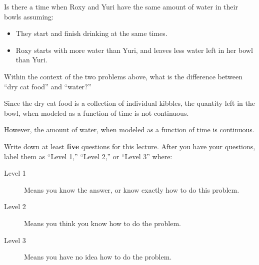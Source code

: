 \documentclass{ximera}
\begin{document}
\begin{problem}
  Is there a time when Roxy and Yuri have the same amount of water in
  their bowls assuming:
  \begin{itemize}
  \item They start and finish drinking at the same times.
  \item Roxy starts with more water than Yuri, and leaves less water
    left in her bowl than Yuri.
  \end{itemize}
    \begin{multipleChoice}
  \end{multipleChoice}
\end{problem}



\begin{problem}
  Within the context of the two problems above, what is the difference
  between ``dry cat food'' and ``water?''
  \begin{freeResponse}
    Since the dry cat food is a collection of individual kibbles, the
    quantity left in the bowl, when modeled as a function of time is
    not continuous.

    However, the amount of water, when modeled as a function of time
    is continuous. 
  \end{freeResponse}
\end{problem}



\begin{xarmaBoost}
  Write down at least \textbf{five} questions for this lecture. After
  you have your questions, label them as ``Level 1,'' ``Level 2,'' or
  ``Level 3'' where:
\begin{description}
\item[Level 1] Means you know the answer, or know exactly how to do
  this problem.
\item[Level 2] Means you think you know how to do the problem.
\item[Level 3] Means you have no idea how to do the problem.
\end{description}
\begin{freeResponse}
\end{freeResponse}
\end{xarmaBoost}
\end{document}
